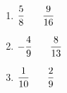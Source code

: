 \documentclass[12pt]{article}
\begin{document}
\begin{multicols}{2}
\begin{enumerate}
  \item \hspace{0.25in} $\dfrac{5}{8} \hspace{0.25in} \dfrac{9}{16}$
  \vspace{0.25in}

  \item \hspace{0.25in} $-\dfrac{4}{9} \hspace{0.25in} \dfrac{8}{13}$
  \vspace{0.25in}

  \item \hspace{0.25in} $\dfrac{1}{10} \hspace{0.25in} \dfrac{2}{9}$
  \vspace{0.25in}

\end{enumerate}
\end{multicols}

  \vspace{0.5in}
\end{document}
